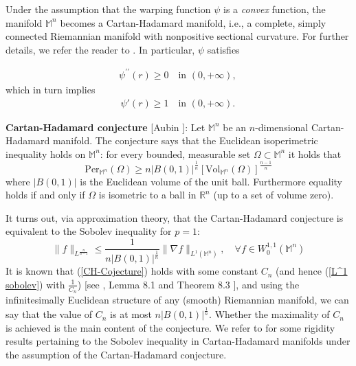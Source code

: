 \documentclass[a4paper,11pt,reqno]{amsart}
\renewcommand\eqref[1]{(\ref{#1})}
\theoremstyle{plain}
\numberwithin{equation}{section} \allowdisplaybreaks
\newcommand{\m}{\mathbb{M}^n}
\newcommand{\rn}{\mathbb{R}^n}
\begin{document}
\medskip


Under the assumption that the warping function $\psi$ is a \textit{convex} function, the manifold $\m$ becomes a Cartan-Hadamard manifold, i.e., a complete, simply connected Riemannian manifold with nonpositive sectional curvature. For further details, we refer the reader to 
\cite{GW}. In particular, $\psi$ satisfies

\begin{align*}
    \psi^{\prime \prime}(r)\geq 0 \quad \text{in } (0,+\infty),\,
\end{align*}
which in turn implies 
\begin{align*}
    \psi'(r)\geq 1 \quad \text{in } (0,+\infty).\,
\end{align*}

\medskip


\textbf{Cartan-Hadamard conjecture} [Aubin \cite{Aubin}]: Let $\m$ be an $n$-dimensional Cartan-Hadamard manifold. The conjecture says that the Euclidean isoperimetric inequality holds on $\m$: for every bounded, measurable set $\Omega\subset \m$ it holds that
\begin{equation}\label{CH-Cojecture}
    \text{Per}_{\m}(\Omega)\geq n|B(0,1)|^{\frac{1}{n}}[\text{Vol}_{\m}(\Omega)]^{\frac{n-1}{n}}
\end{equation}
where $|B(0,1)|$ is the Euclidean volume of the unit ball. Furthermore equality holds if and only if  $\Omega$ is isometric to a ball in $\rn$ (up to a set of volume zero).

\medskip


It turns out, via approximation theory, that the Cartan-Hadamard conjecture is equivalent to the Sobolev inequality for $p=1$:
\begin{equation}\label{L^1 sobolev}
    \|f\|_{L^{\frac{n}{n-1}}}\leq \frac{1}{n|B(0,1)|^{\frac{1}{n}}}\|\nabla f\|_{L^1(\m)},\quad \forall f\in W^{1,1}_0(\m)
\end{equation}
It is known that \eqref{CH-Cojecture} holds with some constant $C_n$ (and hence \eqref{L^1 sobolev} with $\frac{1}{C_n}$) [see \cite{Hebey}, Lemma 8.1 and Theorem 8.3 ], and using the infinitesimally Euclidean structure of any (smooth) Riemannian manifold, we can say that the value of $C_n$ is at most $n|B(0,1)|^{\frac{1}{n}}$. Whether the maximality of $C_n$ is achieved is the main content of the conjecture. We refer to \cite[Theorem 1.1]{Muratori-Soave} for some rigidity results pertaining to the Sobolev inequality in Cartan-Hadamard manifolds under the assumption of the Cartan-Hadamard conjecture.
\end{document}
